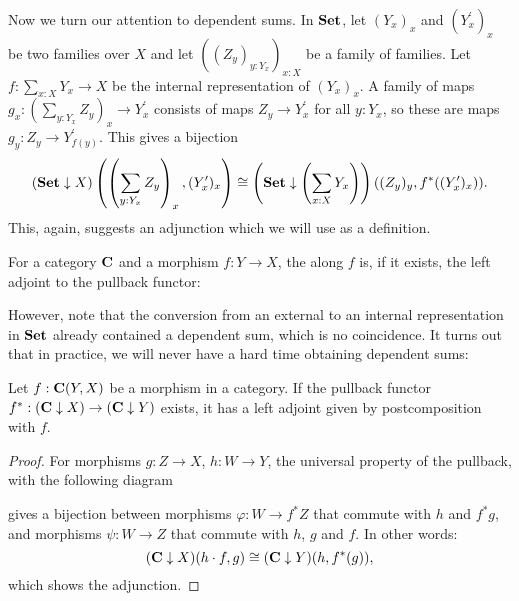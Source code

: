 Now we turn our attention to dependent sums. In $ \mathbf{Set} $, let $ (Y_x)_x $ and $ (Y^\prime_x)_x $ be two families over $ X $ and let $ ((Z_y)_{y : Y_x})_{x : X} $ be a family of families. Let $ f: \sum_{x : X} Y_x \to X $ be the internal representation of $ (Y_x)_x $. A family of maps $ g_x : (\sum_{y : Y_x} Z_y)_x \to Y^\prime_x $ consists of maps $ Z_y \to Y^\prime_x $ for all $ y : Y_x $, so these are maps $ g_y : Z_y \to Y^\prime_{f(y)} $. This gives a bijection
\[ (\mathbf{Set} \downarrow X)\left(\left( \sum_{y : Y_x} Z_y \right)_x, (Y^\prime_x)_x \right) \cong \left(\mathbf{Set} \downarrow \left(\sum_{x : X} Y_x \right) \right)((Z_y)_y, f^*((Y^\prime_x)_x)). \]
This, again, suggests an adjunction which we will use as a definition.
\begin{definition}
  For a category $ \mathbf{C} $ and a morphism $ f: Y \to X $, the  along $ f $ is, if it exists, the left adjoint to the pullback functor:
  \begin{center}
  \end{center}
\end{definition}

However, note that the conversion from an external to an internal representation in $ \mathbf{Set} $ already contained a dependent sum, which is no coincidence. It turns out that in practice, we will never have a hard time obtaining dependent sums:
\begin{lemma}\label{lem:sum-postcomposition}
  Let $ f : \mathbf{C}(Y, X) $ be a morphism in a category. If the pullback functor $ f^*: (\mathbf{C} \downarrow X) \to (\mathbf{C} \downarrow Y) $ exists, it has a left adjoint given by postcomposition with $ f $.
\end{lemma}
\begin{proof}
  For morphisms $ g: Z \to X $, $ h: W \to Y $, the universal property of the pullback, with the following diagram
  \begin{center}
  \end{center}
  gives a bijection between morphisms $ \varphi: W \to f^* Z $ that commute with $ h $ and $ f^* g $, and morphisms $ \psi: W \to Z $ that commute with $ h $, $ g $ and $ f $. In other words:
  \[ (\mathbf{C} \downarrow X)(h \cdot f, g) \cong (\mathbf{C} \downarrow Y)(h, f^*(g)), \]
  which shows the adjunction.
\end{proof}

